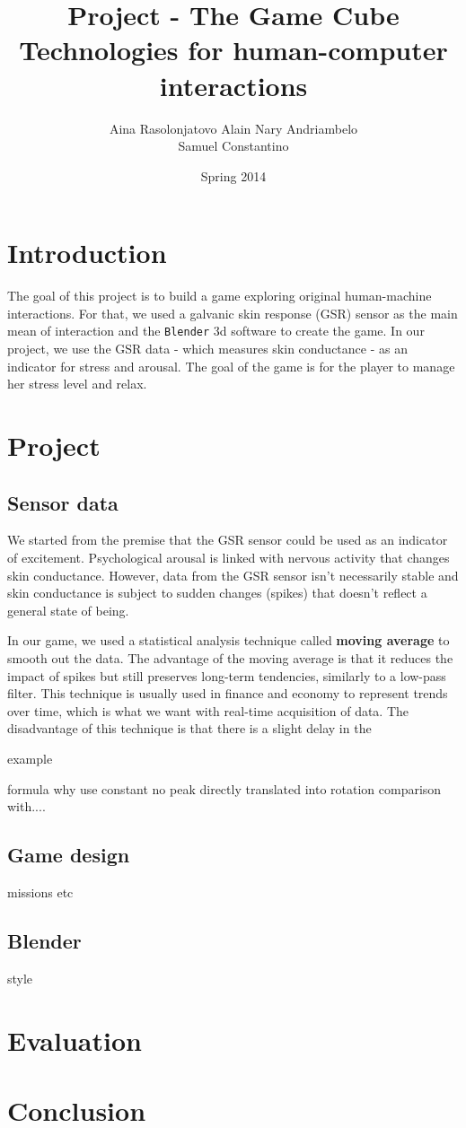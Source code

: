 \documentclass[12pt,a4paper]{article}
\title{\LARGE \textbf{Project - The Game Cube\textregistered}\\
	\bigskip
	\bigskip
	\large Technologies for human-computer interactions}
\author{Aina Rasolonjatovo Alain Nary Andriambelo \\ Samuel Constantino}
\date{Spring 2014}
\begin{document}
	\maketitle


\section{Introduction}

The goal of this project is to build a game exploring original human-machine interactions. For that, we used a galvanic skin response (GSR) sensor as the main mean of interaction and the \texttt{Blender} 3d software to create the game. In our project, we use the GSR data - which measures skin conductance - as an indicator for stress and arousal. The goal of the game is for the player to manage her stress level and relax. 

\section{Project}

\subsection{Sensor data}

We started from the premise that the GSR sensor could be used as an indicator of excitement. Psychological arousal is linked with nervous activity that changes skin conductance. However, data from the GSR sensor isn't necessarily stable and skin conductance is subject to sudden changes (spikes) that doesn't reflect a general state of being.

In our game, we used a statistical analysis technique called \textbf{moving average} to smooth out the data. The advantage of the moving average is that it reduces the impact of spikes but still preserves long-term tendencies, similarly to a low-pass filter. This technique is usually used in finance and economy to represent trends over time, which is what we want with real-time acquisition of data. The disadvantage of this technique is that there is a slight delay in the 

example

formula
why use
	constant
	no peak
	directly translated into rotation
	comparison with....

\subsection{Game design}

missions etc

\subsection{Blender}

style

\section{Evaluation}



\section{Conclusion}
\end{document}
